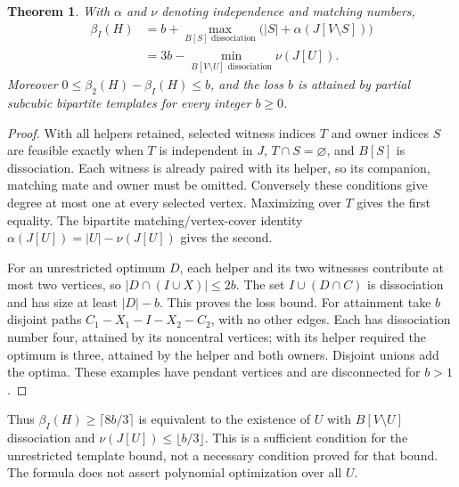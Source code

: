 \documentclass[11pt]{article}
\newtheorem{theorem}{Theorem}
\newcommand{\diss}{\beta_2}
\begin{document}
\begin{theorem}\label{thm:all-helper}
With $\alpha$ and $\nu$ denoting independence and matching numbers,
\begin{align*}
 \beta_I(H)&=b+\max_{B[S]\text{ dissociation}}
          \bigl(|S|+\alpha(J[V\setminus S])\bigr)\\
 &=3b-\min_{B[V\setminus U]\text{ dissociation}}\nu(J[U]).
\end{align*}
Moreover $0\le\diss(H)-\beta_I(H)\le b$, and the loss $b$ is attained by
partial subcubic bipartite templates for every integer $b\ge0$.
\end{theorem}
\begin{proof}
With all helpers retained, selected witness indices $T$ and owner indices $S$
are feasible exactly when $T$ is independent in $J$, $T\cap S=\varnothing$,
and $B[S]$ is dissociation. Each witness is already paired with its helper,
so its companion, matching mate and owner must be omitted. Conversely these
conditions give degree at most one at every selected vertex. Maximizing over
$T$ gives the first equality. The bipartite matching/vertex-cover identity
$\alpha(J[U])=|U|-\nu(J[U])$ gives the second.

For an unrestricted optimum $D$, each helper and its two witnesses contribute
at most two vertices, so $|D\cap(I\cup X)|\le2b$. The set
$I\cup(D\cap C)$ is dissociation and has size at least $|D|-b$.
This proves the loss bound. For attainment take $b$ disjoint paths
$C_1-X_1-I-X_2-C_2$, with no other edges. Each has dissociation number four,
attained by its noncentral vertices; with its helper required the optimum
is three, attained by the helper and both owners. Disjoint unions add the
optima. These examples have pendant vertices and are disconnected for $b>1$.
\end{proof}

Thus $\beta_I(H)\ge\lceil8b/3\rceil$ is equivalent to the existence of
$U$ with $B[V\setminus U]$ dissociation and
$\nu(J[U])\le\lfloor b/3\rfloor$. This is a sufficient condition for the
unrestricted template bound, not a necessary condition proved for that bound.
The formula does not assert polynomial optimization over all $U$.
\end{document}
